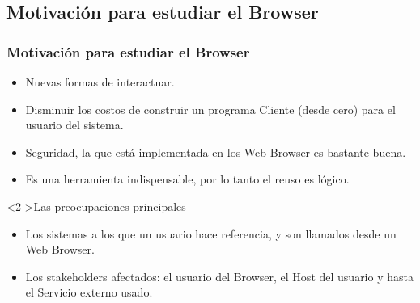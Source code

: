 \documentclass[serif,9pt]{beamer}
\begin{document}

\subsection{Motivaci\'on para estudiar el Browser}
\begin{frame}
	\frametitle{Motivaci\'on para estudiar el Browser}
	\begin{itemize}
		\item Nuevas formas de interactuar.
		\item Disminuir los costos de construir un programa Cliente (desde cero) para
el usuario del sistema.
		\item Seguridad, la que est\'a implementada en los Web Browser es bastante buena.
		\item Es una herramienta indispensable, por lo tanto el reuso es lógico.
	\end{itemize}
	
	\begin{block}<2->{Las preocupaciones principales}
	\begin{itemize}
		\item Los sistemas a los que un usuario hace referencia, y son llamados desde un Web Browser.
		\item Los stakeholders afectados: el usuario del Browser, el Host del usuario y hasta el Servicio externo usado.
	\end{itemize}
	\end{block}
\end{frame}
\end{document}
